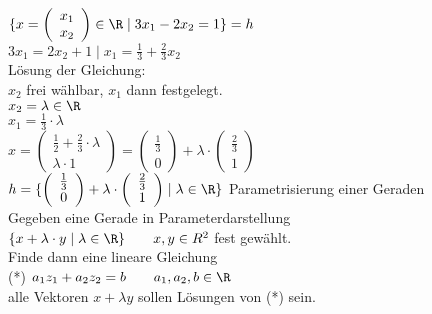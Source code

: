 $\{x = \left( \begin{array}{c}x_1 \\ x_2\end{array} \right) \in \R \mid 3x_1 - 2x_2 = 1 \} = h$\\
$3x_1 = 2x_2 + 1 \mid x_1 = \frac{1}{3} + \frac{2}{3}x_2$\\
Lösung der Gleichung:\\
$x_2$ frei wählbar, $x_1$ dann festgelegt.\\
$x_2 = \lambda \in \R$\\
$x_1 = \frac{1}{3} \cdot \lambda$\\
$x = \left( \begin{array}{c}\frac{1}{2} + \frac{2}{3} \cdot \lambda \\ \lambda \cdot 1\end{array} \right) = \left( \begin{array}{c}\frac{1}{3} \\ 0\end{array} \right) + \lambda \cdot \left( \begin{array}{c}\frac{2}{3} \\ 1\end{array} \right)$\\
$h = \{\left( \begin{array}{c}\frac{1}{3} \\ 0\end{array} \right) + \lambda \cdot \left( \begin{array}{c}\frac{2}{3} \\ 1\end{array} \right) \mid \lambda \in \R \}$ Parametrisierung einer Geraden\\
Gegeben eine Gerade in Parameterdarstellung\\
$\{ x + \lambda \cdot y \mid \lambda \in \R \} \qquad x, y \in R^2$ fest gewählt.\\
Finde dann eine lineare Gleichung\\
(*) $a_1 z_1 + a_2 z_2 = b \qquad a_1, a_2, b \in \R$\\
alle Vektoren $x + \lambda y$ sollen Lösungen von (*) sein.\\



